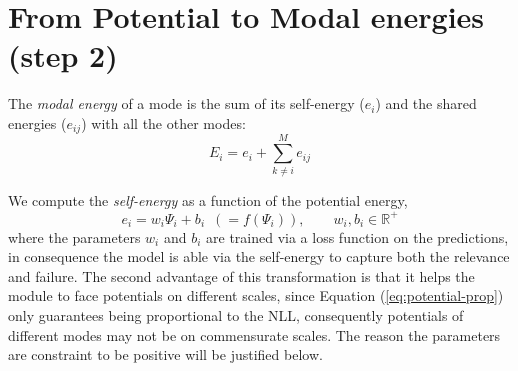 
\section{From Potential to Modal energies (step 2)}
The \textit{modal energy} of a mode is the sum of its self-energy ($e_i$) and the shared energies ($e_{ij}$) with all the other modes:
\begin{equation}
E_i = e_i + \sum_{k\neq i}^M e_{ij}
\end{equation}

We compute the \textit{self-energy} as a function of the potential energy,
\begin{equation}
e_i = w_i\Psi_i + b_i\,\,\, (=f(\Psi_i)), \qquad w_i, b_i \in \mathbb{R}^+
\label{eq:self-energy}
\end{equation}
where the parameters $w_i$ and $b_i$ are trained via a loss function on the predictions, in consequence the model is able via the self-energy to capture both the relevance and failure. The second advantage of this transformation is that it helps the module to face potentials on different scales, since Equation (\ref{eq:potential-prop}) only guarantees being proportional to the NLL, consequently potentials of different modes may not be on commensurate scales. The reason the parameters are constraint to be positive will be justified below.

